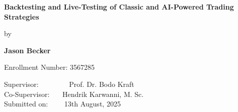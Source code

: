 \begin{titlepage}
    \vspace{2cm}

    \begin{minipage}{0.9\textwidth}
        \fontsize{20pt}{16pt}\selectfont
        \begin{center}
            \textbf{Backtesting and Live-Testing of Classic and AI-Powered Trading Strategies}
        \end{center}
    \end{minipage}


    \vspace{2cm}

    \begin{minipage}{0.9\textwidth}
        \fontsize{14pt}{16pt}\selectfont
        \begin{center}
            by
        \end{center}
    \end{minipage}

    \vspace{0.2cm}

    \begin{minipage}{0.9\textwidth}
        \fontsize{14pt}{16pt}\selectfont
        \begin{center}
            \textbf{Jason Becker}
        \end{center}
    \end{minipage}

    \vspace{0.2cm}

    \begin{minipage}{0.9\textwidth}
        \fontsize{14pt}{16pt}\selectfont
        \begin{center}
            Enrollment Number: 3567285
        \end{center}
    \end{minipage}

    \vspace{5cm}

    \begin{minipage}{0.9\textwidth}
        \fontsize{12pt}{16pt}\selectfont
        Supervisor: \ \ \ \ \ \ \ \ Prof. Dr. Bodo Kraft \\
        Co-Supervisor: \ \ \ Hendrik Karwanni, M. Sc. \\
        Submitted on: \ \ \ \ 13th August, 2025
    \end{minipage}

\end{titlepage}